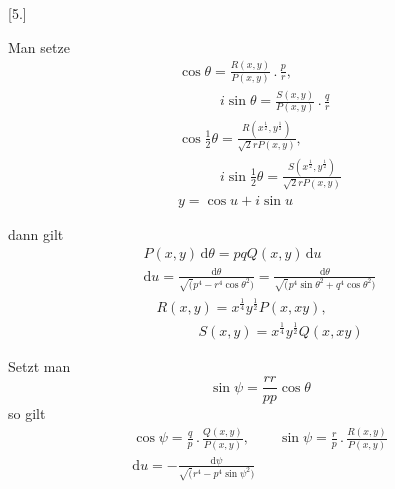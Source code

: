 \begingroup
\renewcommand{\arraystretch}{1.45}

\par\medskip{}\centerline{[5.]}\nobreak\smallskip
Man setze
\[
\begin{gathered}
\cos\theta=\frac{R(x,y)}{P(x,y)}\,.\,\frac{p}{r},
\\[8pt]\quad{}\qquad i\sin\theta=\frac{S(x,y)}{P(x,y)}\,.\,\frac{q}{r}
\\[8pt]
\cos\tfrac12\theta=\frac{R(x^{\frac12},y^{\frac12})}{\surd 2rP(x,y)},
\\[8pt]\quad{}\qquad i\sin\tfrac12\theta=\frac{S(x^{\frac12},y^{\frac12})}{\surd 2rP(x,y)}
\\[8pt]
y=\cos u+i\sin u
\end{gathered}
\]

dann gilt
\[
\begin{gathered}
P(x,y)\,\mathrm{d}\theta=pqQ(x,y)\,\mathrm{d}u
\\[8pt]
\mathrm{d}u=\frac{\mathrm{d}\theta}{\surd(p^4-r^4\cos\theta^2)}
=\frac{\mathrm{d}\theta}{\surd(p^4\sin\theta^2+q^4\cos\theta^2)}
\end{gathered}
\]
\[
\begin{gathered}R(x,y)=x^{\frac14}y^{\frac12}P(x,xy),
\\[8pt]\quad{}\qquad S(x,y)=x^{\frac14}y^{\frac12}Q(x,xy)\end{gathered}
\]

Setzt man
\[
\sin\psi=\frac{rr}{pp}\cos\theta
\]
so gilt
\[
\begin{gathered}
\cos\psi=\frac{q}{p}\,.\,\frac{Q(x,y)}{P(x,y)},
\qquad \sin\psi=\frac{r}{p}\,.\,\frac{R(x,y)}{P(x,y)}
\\[8pt]
\mathrm{d}u=-\frac{\mathrm{d}\psi}{\surd(r^4-p^4\sin\psi^2)}
\end{gathered}
\]

